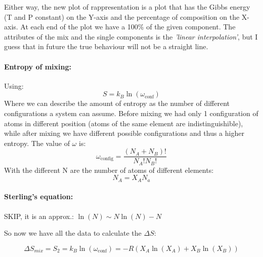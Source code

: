 \noindent Either way, the new plot of rappresentation is a plot that has the Gibbs energy (T and P constant) on the Y-axis and the percentage of composition on the X-axis. At each end of the plot we have a 100\% of the given component. The attributes of the mix and the single components is the \textit{'linear interpolation'}, but I guess that in future the true behaviour will not be a straight line.

\paragraph{Entropy of mixing:} Using:
\begin{equation}
    S = k_B \ln(\omega_{\text{conf}})
\end{equation}
Where we can describe the amount of entropy as the number of different configurations a system can assume. Before mixing we had only 1 configuration of atoms in different position (atoms of the same element are indistinguishible), while after mixing we have different possible configurations and thus a higher entropy. The value of $\omega$ is:
\begin{equation}
    \omega_{\text{config}} = \frac{(N_A + N_B)!}{N_A!N_B!}
\end{equation}
With the different N are the number of atoms of different elements: 
\begin{equation}
    N_A = X_A N_a
\end{equation}

\paragraph{Sterling's equation:} SKIP, it is an approx.: $\ln(N) \sim N\ln(N) - N$ 

So now we have all the data to calculate the $\Delta S$:

\begin{equation}
    \Delta S_{mix} = S_2 = k_B\ln(\omega_{\text{conf}}) = -R(X_A\ln(X_A) + X_B\ln(X_B))
\end{equation}